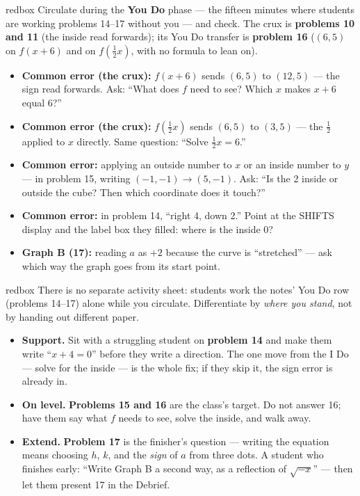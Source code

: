 \documentclass[10pt]{article}
\begin{document}
\begin{skillbox}{redbox}
Circulate during the \textbf{You Do} phase --- the fifteen minutes where students are working
problems 14--17 without you --- and check. The crux is \textbf{problems 10 and 11} (the inside
read forwards); its You Do transfer is \textbf{problem 16} ($(6, 5)$ on $f(x + 6)$ and on
$f(\tfrac{1}{2}x)$, with no formula to lean on).
\begin{itemize}
  \item \textbf{Common error (the crux):} $f(x + 6)$ sends $(6, 5)$ to $(12, 5)$ --- the sign
        read forwards. Ask: ``What does $f$ need to see? Which $x$ makes $x + 6$ equal 6?''
  \item \textbf{Common error (the crux):} $f(\tfrac{1}{2}x)$ sends $(6, 5)$ to $(3, 5)$ ---
        the $\tfrac{1}{2}$ applied to $x$ directly. Same question: ``Solve
        $\tfrac{1}{2}x = 6$.''
  \item \textbf{Common error:} applying an outside number to $x$ or an inside number to $y$ ---
        in problem 15, writing $(-1, -1) \to (5, -1)$. Ask: ``Is the 2 inside or outside the
        cube? Then which coordinate does it touch?''
  \item \textbf{Common error:} in problem 14, ``right 4, down 2.'' Point at the SHIFTS display
        and the label box they filled: where is the inside 0?
  \item \textbf{Graph B (17):} reading $a$ as $+2$ because the curve is ``stretched'' --- ask
        which way the graph goes from its start point.
\end{itemize}
\end{skillbox}

\begin{skillbox}{redbox}
There is no separate activity sheet: students work the notes' You Do row (problems 14--17)
alone while you circulate. Differentiate by \textit{where you stand}, not by handing out
different paper.

\begin{itemize}
  \item \textbf{Support.} Sit with a struggling student on \textbf{problem 14} and make them
        write ``$x + 4 = 0$'' before they write a direction. The one move from the I Do ---
        solve for the inside --- is the whole fix; if they skip it, the sign error is already
        in.
  \item \textbf{On level.} \textbf{Problems 15 and 16} are the class's target. Do not answer
        16; have them say what $f$ needs to see, solve the inside, and walk away.
  \item \textbf{Extend.} \textbf{Problem 17} is the finisher's question --- writing the
        equation means choosing $h$, $k$, and the \emph{sign} of $a$ from three dots. A student
        who finishes early: ``Write Graph B a second way, as a reflection of $\sqrt{-x}$'' ---
        then let them present 17 in the Debrief.
\end{itemize}
\end{skillbox}
\end{document}
